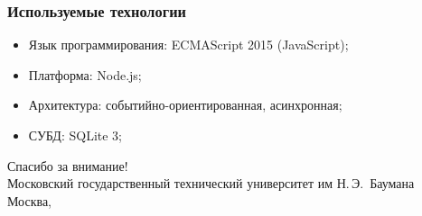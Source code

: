 \documentclass[hyperref={unicode}, 14pt]{beamer}
\begin{document}
\begin{frame}
  \frametitle{Используемые технологии}

  \begin{block}{}
    \begin{itemize}
      \item Язык программирования: ECMAScript 2015 (JavaScript);
      \item Платформа: Node.js;
      \item Архитектура: событийно-ориентированная, асинхронная;
      \item СУБД: SQLite 3;
    \end{itemize}
  \end{block}
\end{frame}

\begin{frame}[plain]
  \centering
  {\Huge Спасибо за внимание!}\\[2cm]

  {\Large Московский государственный технический университет им Н.\,Э.~Баумана}\\[1cm]

  {\large Москва, \the\year}
\end{frame}
\end{document}
